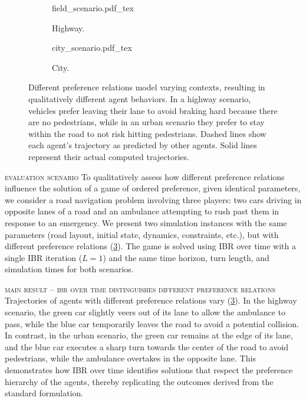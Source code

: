 \begin{figure}[!t]
\centering
    \begin{subfigure}[t]{0.56\linewidth}
        \def\svgwidth{\linewidth}
        {field_scenario.pdf_tex}
        \caption{Highway.}
        \label{fig:field_scenario}
    \end{subfigure}

    \medskip

    \begin{subfigure}[t]{0.56\linewidth}
        \def\svgwidth{\linewidth}
        {city_scenario.pdf_tex}
        \caption{City.}
        \label{fig:city_scenario}
    \end{subfigure}
\caption{
    Different preference relations model varying contexts, resulting in qualitatively different agent behaviors.
    In a highway scenario, vehicles prefer leaving their lane to avoid braking hard because there are no pedestrians,
    while in an urban scenario they prefer to stay within the road to not risk hitting pedestrians.
    Dashed lines show each agent's trajectory as predicted by other agents.
    Solid lines represent their actual computed trajectories.
    }
\label{fig:road_scenario}
\end{figure}

\noindent
\textsc{evaluation scenario} \quad
To qualitatively assess
how different preference relations influence the solution
of a game of ordered preference, given identical parameters,
we consider a road navigation problem involving three players:
two cars driving in opposite lanes
of a road and an ambulance attempting to rush past them
in response to an emergency.
We present two simulation instances
with the same parameters (road layout, initial state, dynamics, constraints, etc.), but with different preference relations (\cref{fig:road_scenario}).
The game is solved using IBR over time with a single IBR iteration (\(L=1\))
and the same time horizon, turn length,
and simulation times for both scenarios.

\smallskip \noindent
\textsc{main result}  -- \textsc{ibr over time distinguishes different preference relations} \quad
Trajectories of agents
with different preference relations vary (\cref{fig:road_scenario}).
In the highway scenario, the green car slightly veers out
of its lane to allow the ambulance to pass,
while the blue car temporarily leaves the road
to avoid a potential collision.
In contrast, in the urban scenario, the green car remains
at the edge of its lane,
and the blue car executes a sharp turn towards the center
of the road to avoid pedestrians,
while the ambulance overtakes in the opposite lane.
This demonstrates how IBR over time identifies solutions
that respect the preference hierarchy
of the agents, thereby replicating the outcomes derived
from the standard formulation.

